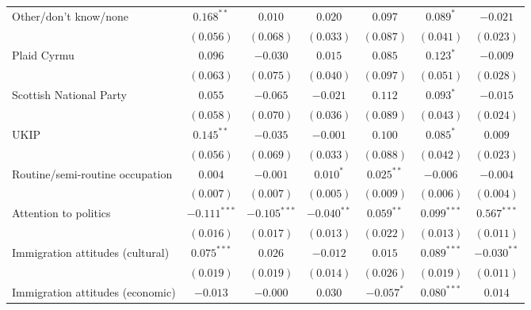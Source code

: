 \documentclass[12pt, letter]{article}
\begin{document}
\begin{table}[H]
\begin{center}
{\begin{tabular}{l c c c c c c}
Other/don't know/none            & $0.168^{**}$   & $0.010$        & $0.020$        & $0.097$        & $0.089^{*}$    & $-0.021$       \\
                                 & $(0.056)$      & $(0.068)$      & $(0.033)$      & $(0.087)$      & $(0.041)$      & $(0.023)$      \\
Plaid Cyrmu                      & $0.096$        & $-0.030$       & $0.015$        & $0.085$        & $0.123^{*}$    & $-0.009$       \\
                                 & $(0.063)$      & $(0.075)$      & $(0.040)$      & $(0.097)$      & $(0.051)$      & $(0.028)$      \\
Scottish National Party          & $0.055$        & $-0.065$       & $-0.021$       & $0.112$        & $0.093^{*}$    & $-0.015$       \\
                                 & $(0.058)$      & $(0.070)$      & $(0.036)$      & $(0.089)$      & $(0.043)$      & $(0.024)$      \\
UKIP                             & $0.145^{**}$   & $-0.035$       & $-0.001$       & $0.100$        & $0.085^{*}$    & $0.009$        \\
                                 & $(0.056)$      & $(0.069)$      & $(0.033)$      & $(0.088)$      & $(0.042)$      & $(0.023)$      \\
Routine/semi-routine occupation  & $0.004$        & $-0.001$       & $0.010^{*}$    & $0.025^{**}$   & $-0.006$       & $-0.004$       \\
                                 & $(0.007)$      & $(0.007)$      & $(0.005)$      & $(0.009)$      & $(0.006)$      & $(0.004)$      \\
Attention to politics            & $-0.111^{***}$ & $-0.105^{***}$ & $-0.040^{**}$  & $0.059^{**}$   & $0.099^{***}$  & $0.567^{***}$  \\
                                 & $(0.016)$      & $(0.017)$      & $(0.013)$      & $(0.022)$      & $(0.013)$      & $(0.011)$      \\
Immigration attitudes (cultural) & $0.075^{***}$  & $0.026$        & $-0.012$       & $0.015$        & $0.089^{***}$  & $-0.030^{**}$  \\
                                 & $(0.019)$      & $(0.019)$      & $(0.014)$      & $(0.026)$      & $(0.019)$      & $(0.011)$      \\
Immigration attitudes (economic) & $-0.013$       & $-0.000$       & $0.030$        & $-0.057^{*}$   & $0.080^{***}$  & $0.014$        \\

\end{tabular}}
\end{center}
\end{table}
\end{document}

